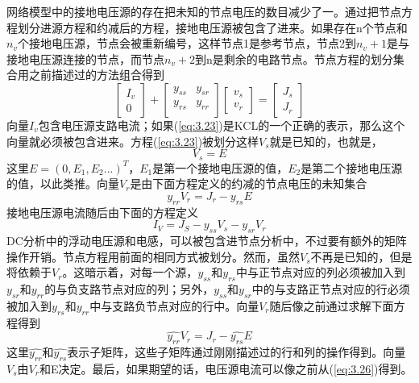 网络模型中的接地电压源的存在把未知的节点电压的数目减少了一。通过把节点方程划分进源方程和约减后的方程，接地电压源被包含了进来。如果存在n个节点和$n_v$个接地电压源，节点会被重新编号，这样节点1是参考节点，节点2到$n_v+1$是与接地电压源连接的节点，而节点$n_v+2$到n是剩余的电路节点。节点方程的划分集合用之前描述过的方法组合得到
\begin{equation}
    \begin{bmatrix}
 I_v\\
 0
\end{bmatrix}+
\begin{bmatrix}
y_{ss} & y_{sr} \\
y_{rs} & y_{rr} \\
\end{bmatrix} \begin{bmatrix}
v_s \\
v_r
\end{bmatrix}=
\begin{bmatrix}
J_s \\
J_r
\end{bmatrix} 
\label{eq:3.23}
\end{equation}
向量$I_v$包含电压源支路电流；如果(\ref{eq:3.23})是KCL的一个正确的表示，那么这个向量就必须被包含进来。方程(\ref{eq:3.23})被划分这样$V_s$就是已知的，也就是，
\begin{equation}
    V_s = E
    \label{eq:3.24}
\end{equation}
这里$E = (0,E_1,E_2...)^T$，$E_1$是第一个接地电压源的值，$E_2$是第二个接地电压源的值，以此类推。向量$V_r$是由下面方程定义的约减的节点电压的未知集合
\begin{equation}
    y_{rr}V_{r} = J_r - y_{rs}E
    \label{eq:3.25}
\end{equation}
接地电压源电流随后由下面的方程定义
\begin{equation}
    I_V = J_S - y_{ss}V_{s}-y_{sr}V_{r}
    \label{eq:3.26}
\end{equation}
DC分析中的浮动电压源和电感，可以被包含进节点分析中，不过要有额外的矩阵操作开销。节点方程用前面的相同方式被划分。然而，虽然$V_s$不再是已知的，但是将依赖于$V_r$。这暗示着，对每一个源，$y_{ss}$和$y_{rs}$中与正节点对应的列必须被加入到$y_{sr}$和$y_{rr}$的与负支路节点对应的列；另外，$y_{ss}$和$y_{sr}$中的与支路正节点对应的行必须被加入到$y_{rs}$和$y_{rr}$中与支路负节点对应的行中。向量$V_r$随后像之前通过求解下面方程得到
\begin{equation}
    \hat{y_{rr}}V_r = J_r - \hat{y_{rs}}E
    \label{eq:3.27}
\end{equation}
这里$\hat{y_{rr}}$和$\hat{y_{rs}}$表示子矩阵，这些子矩阵通过刚刚描述过的行和列的操作得到。向量$V_s$由$V_r$和E决定。最后，如果期望的话，电压源电流可以像之前从(\ref{eq:3.26})得到。

